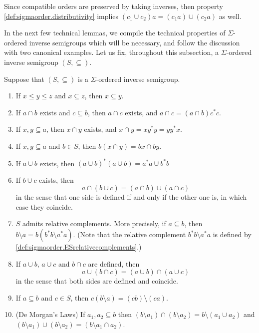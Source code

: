 Since compatible orders are preserved by taking inverses, then property \ref{def:sigmaorder.distributivity} implies $(c_1\cup c_2)a=(c_1a)\cup(c_2a)$ as well.

In the next few technical lemmas, we compile the technical properties of $\Sigma$-ordered inverse semigroups which will be necessary, and follow the discussion with two canonical examples. Let us fix, throughout this subsection, a $\Sigma$-ordered inverse semigroup $(S,\subseteq)$.

\begin{lemma}\label{lem:technicalpropertiesofsigmaorder}
Suppose that $(S,\subseteq)$ is a $\Sigma$-ordered inverse semigroup.
    \begin{enumerate}[label=(\alph*)]
        \item\label{lem:technicalpropertiesofsigmaorder1} If $x\leq y\leq z$ and $x\subseteq z$, then $x\subseteq y$.
        \item\label{lem:technicalpropertiesofsigmaorder2} If $a\cap b$ exists and $c\subseteq b$, then $a\cap c$ exists, and $a\cap c=(a\cap b)c^*c$.
        \item\label{lem:technicalpropertiesofsigmaorder3} If $x,y\subseteq a$, then $x\cap y$ exists, and $x\cap y=xy^*y=yy^*x$.
        \item\label{lem:technicalpropertiesofsigmaorder4} If $x,y\subseteq a$ and $b\in S$, then $b(x\cap y)=bx\cap by$.
        \item\label{lem:technicalpropertiesofsigmaorder5} If $a\cup b$ exists, then $(a\cup b)^*(a\cup b)=a^*a\cup b^*b$
        \item\label{lem:technicalpropertiesofsigmaorder6} If $b\cup c$ exists, then
        \[a\cap(b\cup c)=(a\cap b)\cup(a\cap c)\]
        in the sense that one side is defined if and only if the other one is, in which case they coincide.
        \item\label{lem:technicalpropertiesofsigmaorder7} $S$ admits relative complements. More precisely, if $a\subseteq b$, then $b\setminus a=b(b^*b\setminus a^*a)$. (Note that the relative complement $b^*b\setminus a^*a$ is defined by \ref{def:sigmaorder.ESrelativecomplements}.)
        \item\label{lem:technicalpropertiesofsigmaorder8} If $a\cup b$, $a\cup c$ and $b\cap c$ are defined, then
        \[a\cup(b\cap c)=(a\cup b)\cap (a\cup c)\]
        in the sense that both sides are defined and coincide.
        \item\label{lem:technicalpropertiesofsigmaorder9} If $a\subseteq b$ and $c\in S$, then $c(b\setminus a)=(cb)\setminus (ca)$.
        \item\label{lem:technicalpropertiesofsigmaorder10} (De Morgan's Laws) If $a_1,a_2\subseteq b$ then $(b\setminus a_1)\cap(b\setminus a_2)=b\setminus(a_1\cup a_2)$ and $(b\setminus a_1)\cup(b\setminus a_2)=(b\setminus a_1\cap a_2)$.
    \end{enumerate}
\end{lemma}
